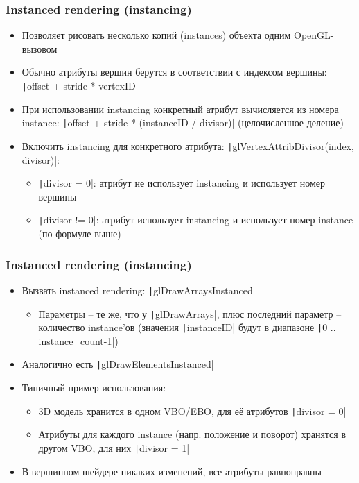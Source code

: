 \documentclass{beamer}
\begin{document}
\begin{frame}[fragile]
\frametitle{Instanced rendering (instancing)}
\begin{itemize}
\item Позволяет рисовать несколько копий (instances) объекта одним OpenGL-вызовом
\pause
\item Обычно атрибуты вершин берутся в соответствии с индексом вершины: \texttt|offset + stride * vertexID|
\pause
\item При использовании instancing конкретный атрибут вычисляется из номера instance: \texttt|offset + stride * (instanceID / divisor)| (целочисленное деление)
\pause
\item Включить instancing для конкретного атрибута: \texttt|glVertexAttribDivisor(index, divisor)|:
\begin{itemize}
\item \texttt|divisor = 0|: атрибут не использует instancing и использует номер вершины
\item \texttt|divisor != 0|: атрибут использует instancing и использует номер instance (по формуле выше)
\end{itemize}
\end{itemize}
\end{frame}

\begin{frame}[fragile]
\frametitle{Instanced rendering (instancing)}
\begin{itemize}
\item Вызвать instanced rendering: \texttt|glDrawArraysInstanced|
\begin{itemize}
\item Параметры -- те же, что у \texttt|glDrawArrays|, плюс последний параметр -- количество instance'ов (значения \texttt|instanceID| будут в диапазоне \texttt|0 .. instance_count-1|)
\end{itemize}
\pause
\item Аналогично есть \texttt|glDrawElementsInstanced|
\pause
\item Типичный пример использования:
\begin{itemize}
\item 3D модель хранится в одном VBO/EBO, для её атрибутов \texttt|divisor = 0|
\item Атрибуты для каждого instance (напр. положение и поворот) хранятся в другом VBO, для них \texttt|divisor = 1|
\end{itemize}
\pause
\item В вершинном шейдере никаких изменений, все атрибуты равноправны
\end{itemize}
\end{frame}
\end{document}
